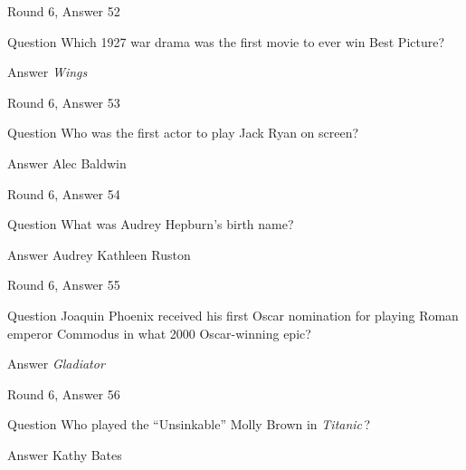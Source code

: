 \documentclass[11pt]{beamer}
\begin{document}
\begin{frame}[t]{Round 6, Answer 52}
\vspace{2em}
\begin{block}{Question}
Which 1927 war drama was the first movie to ever win Best Picture?
\end{block}
\pause{}
\begin{block}{Answer}
\emph{Wings}
\end{block}
\end{frame}
    

\begin{frame}[t]{Round 6, Answer 53}
\vspace{2em}
\begin{block}{Question}
Who was the first actor to play Jack Ryan on screen?
\end{block}
\pause{}
\begin{block}{Answer}
Alec Baldwin
\end{block}
\end{frame}
    

\begin{frame}[t]{Round 6, Answer 54}
\vspace{2em}
\begin{block}{Question}
What was Audrey Hepburn's birth name?
\end{block}
\pause{}
\begin{block}{Answer}
Audrey Kathleen Ruston
\end{block}
\end{frame}
    

\begin{frame}[t]{Round 6, Answer 55}
\vspace{2em}
\begin{block}{Question}
Joaquin Phoenix received his first Oscar nomination for playing Roman emperor Commodus in what 2000 Oscar-winning epic?
\end{block}
\pause{}
\begin{block}{Answer}
\emph{Gladiator}
\end{block}
\end{frame}
    

\begin{frame}[t]{Round 6, Answer 56}
\vspace{2em}
\begin{block}{Question}
Who played the ``Unsinkable'' Molly Brown in \emph{Titanic}\,?
\end{block}
\pause{}
\begin{block}{Answer}
Kathy Bates
\end{block}
\end{frame}
    
\end{document}
